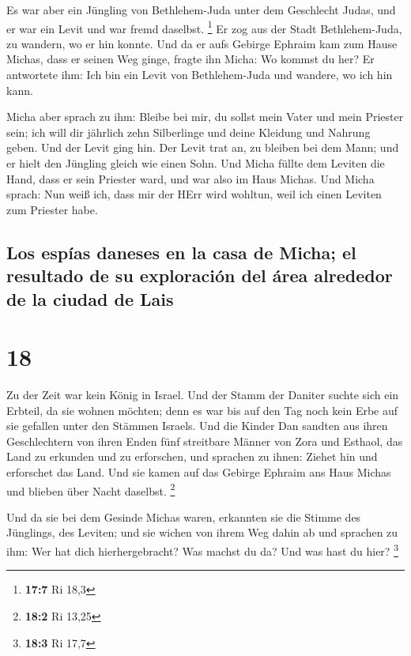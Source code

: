  Es war aber ein Jüngling von Bethlehem-Juda unter dem
Geschlecht Judas, und er war ein Levit und war fremd daselbst.
\footnote{\textbf{17:7} Ri 18,3}  Er zog aus der Stadt
Bethlehem-Juda, zu wandern, wo er hin konnte. Und da er aufs Gebirge
Ephraim kam zum Hause Michas, dass er seinen Weg ginge, 
fragte ihn Micha: Wo kommst du her? Er antwortete ihm: Ich bin ein Levit
von Bethlehem-Juda und wandere, wo ich hin kann.

 Micha aber sprach zu ihm: Bleibe bei mir, du sollst mein
Vater und mein Priester sein; ich will dir jährlich zehn Silberlinge und
deine Kleidung und Nahrung geben. Und der Levit ging hin.
 Der Levit trat an, zu bleiben bei dem Mann; und er hielt
den Jüngling gleich wie einen Sohn.  Und Micha füllte dem
Leviten die Hand, dass er sein Priester ward, und war also im Haus
Michas.  Und Micha sprach: Nun weiß ich, dass mir der
HErr wird wohltun, weil ich einen Leviten zum Priester habe.

\hypertarget{los-espuxedas-daneses-en-la-casa-de-micha-el-resultado-de-su-exploraciuxf3n-del-uxe1rea-alrededor-de-la-ciudad-de-lais}{%
\subsection{Los espías daneses en la casa de Micha; el resultado de su
exploración del área alrededor de la ciudad de
Lais}\label{los-espuxedas-daneses-en-la-casa-de-micha-el-resultado-de-su-exploraciuxf3n-del-uxe1rea-alrededor-de-la-ciudad-de-lais}}

\hypertarget{section-17}{%
\section{18}\label{section-17}}

 Zu der Zeit war kein König in Israel. Und der Stamm der
Daniter suchte sich ein Erbteil, da sie wohnen möchten; denn es war bis
auf den Tag noch kein Erbe auf sie gefallen unter den Stämmen Israels.
 Und die Kinder Dan sandten aus ihren Geschlechtern von
ihren Enden fünf streitbare Männer von Zora und Esthaol, das Land zu
erkunden und zu erforschen, und sprachen zu ihnen: Ziehet hin und
erforschet das Land. Und sie kamen auf das Gebirge Ephraim ans Haus
Michas und blieben über Nacht daselbst. \footnote{\textbf{18:2} Ri 13,25}

 Und da sie bei dem Gesinde Michas waren, erkannten sie
die Stimme des Jünglings, des Leviten; und sie wichen von ihrem Weg
dahin ab und sprachen zu ihm: Wer hat dich hierhergebracht? Was machst
du da? Und was hast du hier? \footnote{\textbf{18:3} Ri 17,7}

